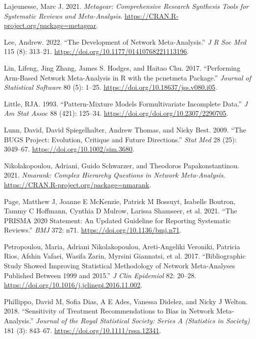 \begin{CSLReferences}{1}{0}
\leavevmode{}%
Lajeunesse, Marc J. 2021. \emph{Metagear: Comprehensive Research Synthesis Tools for Systematic Reviews and Meta-Analysis}. \url{https://CRAN.R-project.org/package=metagear}.

\leavevmode{}%
Lee, Andrew. 2022. {``The Development of Network Meta-Analysis.''} \emph{J R Soc Med} 115 (8): 313--21. \url{https://doi.org/10.1177/01410768221113196}.

\leavevmode{}%
Lin, Lifeng, Jing Zhang, James S. Hodges, and Haitao Chu. 2017. {``Performing Arm-Based Network Meta-Analysis in {R} with the {pcnetmeta} Package.''} \emph{Journal of Statistical Software} 80 (5): 1--25. \url{https://doi.org/10.18637/jss.v080.i05}.

\leavevmode{}%
Little, RJA. 1993. {``Pattern-Mixture Models Formultivariate Incomplete Data.''} \emph{J Am Stat Assoc} 88 (421): 125--34. \url{https://doi.org/doi.org/10.2307/2290705}.

\leavevmode{}%
Lunn, David, David Spiegelhalter, Andrew Thomas, and Nicky Best. 2009. {``The BUGS Project: Evolution, Critique and Future Directions.''} \emph{Stat Med} 28 (25): 3049--67. \url{https://doi.org/10.1002/sim.3680}.

\leavevmode{}%
Nikolakopoulou, Adriani, Guido Schwarzer, and Theodoros Papakonstantinou. 2021. \emph{Nmarank: Complex Hierarchy Questions in Network Meta-Analysis}. \url{https://CRAN.R-project.org/package=nmarank}.

\leavevmode{}%
Page, Matthew J, Joanne E McKenzie, Patrick M Bossuyt, Isabelle Boutron, Tammy C Hoffmann, Cynthia D Mulrow, Larissa Shamseer, et al. 2021. {``The PRISMA 2020 Statement: An Updated Guideline for Reporting Systematic Reviews.''} \emph{BMJ} 372: n71. \url{https://doi.org/10.1136/bmj.n71}.

\leavevmode{}%
Petropoulou, Maria, Adriani Nikolakopoulou, Areti-Angeliki Veroniki, Patricia Rios, Afshin Vafaei, Wasifa Zarin, Myrsini Giannatsi, et al. 2017. {``Bibliographic Study Showed Improving Statistical Methodology of Network Meta-Analyses Published Between 1999 and 2015.''} \emph{J Clin Epidemiol} 82: 20--28. \url{https://doi.org/10.1016/j.jclinepi.2016.11.002}.

\leavevmode{}%
Phillippo, David M, Sofia Dias, A E Ades, Vanessa Didelez, and Nicky J Welton. 2018. {``Sensitivity of Treatment Recommendations to Bias in Network Meta-Analysis.''} \emph{Journal of the Royal Statistical Society: Series A (Statistics in Society)} 181 (3): 843--67. \url{https://doi.org/10.1111/rssa.12341}.


\end{CSLReferences}
